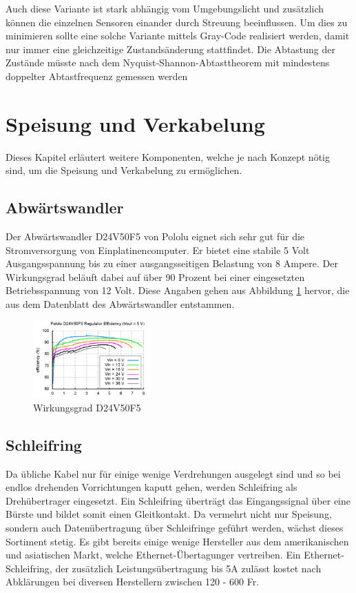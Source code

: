 Auch diese Variante ist stark abhängig vom Umgebungslicht und zusätzlich können die einzelnen Sensoren einander durch Streuung beeinflussen. Um dies zu minimieren sollte eine solche Variante mittels Gray-Code realisiert werden, damit nur immer eine gleichzeitige Zustandsänderung stattfindet. Die Abtastung der Zustände müsste nach dem Nyquist-Shannon-Abtasttheorem mit mindestens doppelter Abtastfrequenz gemessen werden
 
\section{Speisung und Verkabelung}
\label{sec:Speisung und Verkabelung}

Dieses Kapitel erläutert weitere Komponenten, welche je nach Konzept nötig sind, um  die Speisung und Verkabelung zu ermöglichen.

\subsection{Abwärtswandler}
\label{subsec:Abwaertswandler}
Der Abwärtswandler D24V50F5 von Pololu eignet sich sehr gut für die Stromversorgung von Einplatinencomputer. Er bietet eine stabile 5 Volt Ausgangsspannung bis zu einer ausgangsseitigen Belastung von 8 Ampere. Der Wirkungsgrad beläuft dabei auf über 90 Prozent bei einer eingesetzten Betriebsspannung von 12 Volt. Diese Angaben gehen aus Abbildung \ref{fig:D24V50F5} hervor, die aus dem Datenblatt des Abwärtswandler entstammen.\cite{D24V50F5}
\begin{figure}[H]
	\centering
	\includegraphics[width=0.4\textwidth]
	{resources/D24V50F5.PNG}
	\caption[Wirkungsgrad D24V50F5]{Wirkungsgrad D24V50F5 \protect\cite{D24V50F5}}
	\label{fig:D24V50F5}
\end{figure}

\subsection{Schleifring}
\label{subsec:Schleifring}
Da übliche Kabel nur für einige wenige Verdrehungen ausgelegt sind und so bei endlos drehenden Vorrichtungen kaputt gehen, werden Schleifring als Drehübertrager eingesetzt. Ein Schleifring überträgt das Eingangssignal über eine Bürste und bildet somit einen Gleitkontakt. Da vermehrt nicht nur Speisung, sondern auch Datenübertragung über Schleifringe geführt werden, wächst dieses Sortiment stetig. Es gibt bereits einige wenige Hersteller aus dem amerikanischen und asiatischen Markt, welche Ethernet-Übertagunger vertreiben. Ein Ethernet-Schleifring, der zusätzlich Leistungsübertragung bis 5A zulässt kostet nach Abklärungen bei diversen Herstellern zwischen 120 - 600 Fr.  

